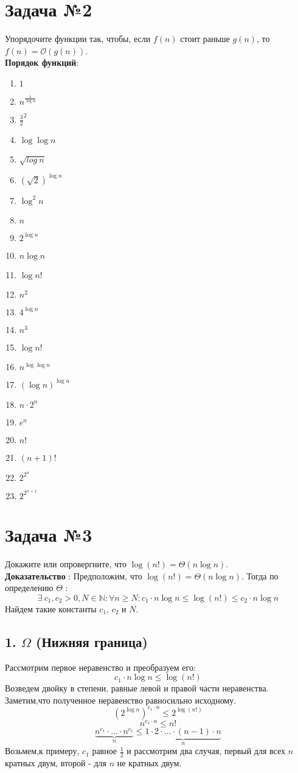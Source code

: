\documentclass{article}
\begin{document}
\section*{Задача №2}
Упорядочите функции так, чтобы, если $f(n)$ стоит раньше $g(n)$, то $f(n) = \mathcal{O}(g(n))$.
\\
\textbf{Порядок функций}:
\begin{multicols}{5}
\begin{enumerate}
\item{$1$}
\item{$n^{\frac{1}{\log n}}$}
\item{$\frac{3}{2}^2$}
\item{$\log{\log{n}}$}
\item{$\sqrt{log \ n}$}
\item{$(\sqrt{2})^{\log{n}}$}
\item{$\log^{2}{n}$}
\item{$n$}
\item{$2^{\log{n}}$}
\item{$n\log n$}
\item{$\log{n!}$}
\item{$n^{2}$}
\item{$4^{\log{n}}$}
\item{$n^{3}$}
\item{$\log{n}!$}
\item{$n^{\log{\log{n}}}$}
\item{$(\log{n})^{\log{n}}$}
\item{$n \cdot 2^{n}$}
\item{$e^{n}$}
\item{$n!$}
\item{$(n + 1)!$}
\item{$2^{2^{n}}$}
\item{$2^{2^{n + 1}}$}
\end{enumerate}
\end{multicols}
\section*{Задача №3}
Докажите или опровергните, что $\log(n!) =\Theta(n\log n).$
\
\\
\textbf{Доказательство} :
Предположим, что $\log(n!) =\Theta(n\log n).$ Тогда по определению $\Theta$ : $$\exists \  c_1, c_2 > 0, N \in \mathbb{N} : \forall n \geq N : c_1 \cdot n \log n  \leq \log(n!) \leq c_2 \cdot n \log n$$ 
Найдем такие константы $c_1$, $c_2$ и $N$. 
\subsection*{1. $\Omega$ (Нижняя граница)}
Рассмотрим первое неравенство и преобразуем его:
$$c_1 \cdot n \log n  \leq \log(n!)$$
Возведем двойку в степени, равные левой и правой части неравенства. Заметим,что полученное неравенство равносильно исходному.
$$(2^{\log n})^{c_1 \cdot n} \leq 2^{\log(n!)}$$
$$n^{c_1 \cdot n} \leq n!$$
$$\underbrace{n^{c_1} \cdot \ldots \cdot n^{c_1}}_{n} \leq \underbrace{1 \cdot 2 \cdot \ldots \cdot (n - 1) \cdot  n}_{n}$$
Возьмем,к примеру, $c_1$ равное $\frac{1}{2}$ и рассмотрим два случая, первый для всех $n$ кратных двум, второй - для $n$ не кратных двум.
\end{document}
